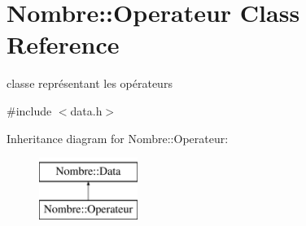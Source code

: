 \hypertarget{classNombre_1_1Operateur}{
\section{Nombre::Operateur Class Reference}
\label{classNombre_1_1Operateur}
}


classe représentant les opérateurs  




{\ttfamily \#include $<$data.h$>$}

Inheritance diagram for Nombre::Operateur:\begin{figure}[H]
\begin{center}
\leavevmode
\includegraphics[height=2cm]{classNombre_1_1Operateur}
\end{center}
\end{figure}
